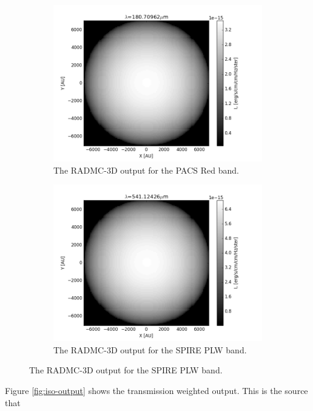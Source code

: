 \documentclass{report}
\begin{document}
\begin{figure}
\begin{subfigure}[b]{.45\linewidth}
\includegraphics[width=\linewidth]{../img/output/red.png}
\caption{The RADMC-3D output for the PACS Red band.}\label{fig:iso-red}
\end{subfigure}
\begin{subfigure}[b]{.45\linewidth}
\includegraphics[width=\linewidth]{../img/output/plw.png}
\caption{The RADMC-3D output for the SPIRE PLW band.}\label{fig:iso-plw}
\end{subfigure}

\end{figure} \label{fig:iso-output}

Figure \ref{fig:iso-output} shows the transmission weighted output. This is the source that
\end{document}
